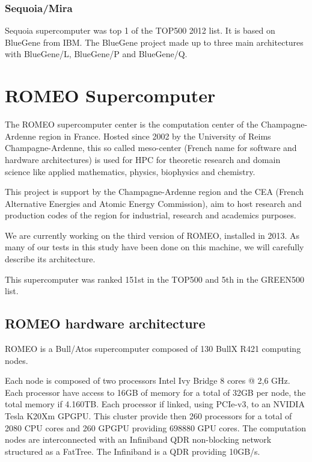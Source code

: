 \subsubsection{Sequoia/Mira}
Sequoia supercomputer was top 1 of the TOP500 2012 list. 
It is based on BlueGene from IBM.
The BlueGene project made up to three main architectures with BlueGene/L, BlueGene/P and BlueGene/Q.

\section{ROMEO Supercomputer}

The ROMEO supercomputer center is the computation center of the Champagne-Ardenne region in France. 
Hosted since 2002 by the University of Reims Champagne-Ardenne, this so called meso-center (French name for software and hardware architectures) is used for HPC for theoretic research and domain science like applied mathematics, physics, biophysics and chemistry. 

This project is support by the Champagne-Ardenne region and the CEA (French Alternative Energies and Atomic Energy Commission), aim to host research and production codes of the region for industrial, research and academics purposes. 

We are currently working on the third version of ROMEO, installed in 2013. 
As many of our tests in this study have been done on this machine, we will carefully describe its architecture. 

This supercomputer was ranked 151st in the TOP500 and 5th in the GREEN500 list. 

\subsection{ROMEO hardware architecture}
\label{sec:part1_ROMEO}
ROMEO is a Bull/Atos supercomputer composed of 130 BullX R421 computing nodes. 

Each node is composed of two processors Intel Ivy Bridge 8 cores @ 2,6 GHz. 
Each processor have access to 16GB of memory for a total of 32GB per node, the total memory if 4.160TB. 
Each processor if linked, using PCIe-v3, to an NVIDIA Tesla K20Xm GPGPU. 
This cluster provide then 260 processors for a total of 2080 CPU cores and 260 GPGPU providing 698880 GPU cores. 
The computation nodes are interconnected with an Infiniband QDR non-blocking network structured as a FatTree. 
The Infiniband is a QDR providing 10GB/s. 

